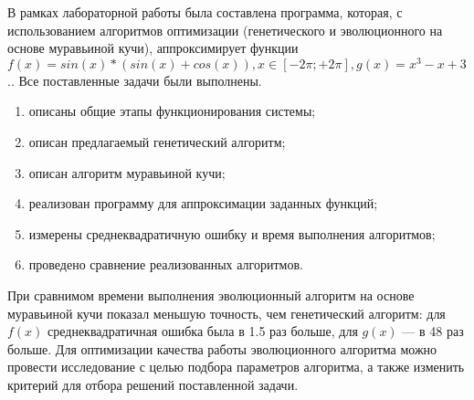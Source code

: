 
В рамках лабораторной работы была составлена программа, которая, с использованием алгоритмов оптимизации (генетического и эволюционного на основе муравьиной кучи), аппроксимирует функции $f(x) = sin(x)*(sin(x)+cos(x)), x\in [-2\pi; +2\pi], g(x) = x^3 - x +3$.. Все поставленные задачи были выполнены.

\begin{enumerate}[label*=\arabic*)]
	\item описаны общие этапы функционирования системы;
	\item описан предлагаемый генетический алгоритм;
	\item описан алгоритм муравьиной кучи;
	\item реализован программу для аппроксимации заданных функций;
	\item измерены среднеквадратичную ошибку и время выполнения алгоритмов;
	\item проведено сравнение реализованных алгоритмов.
\end{enumerate}

При сравнимом времени выполнения эволюционный алгоритм на основе муравьиной кучи показал меньшую точность, чем генетический алгоритм: для $f(x)$ среднеквадратичная ошибка была в 1.5 раз больше, для $g(x)$ --- в 48 раз больше. Для оптимизации качества работы эволюционного алгоритма можно провести исследование с целью подбора параметров алгоритма, а также изменить критерий для отбора решений поставленной задачи.
